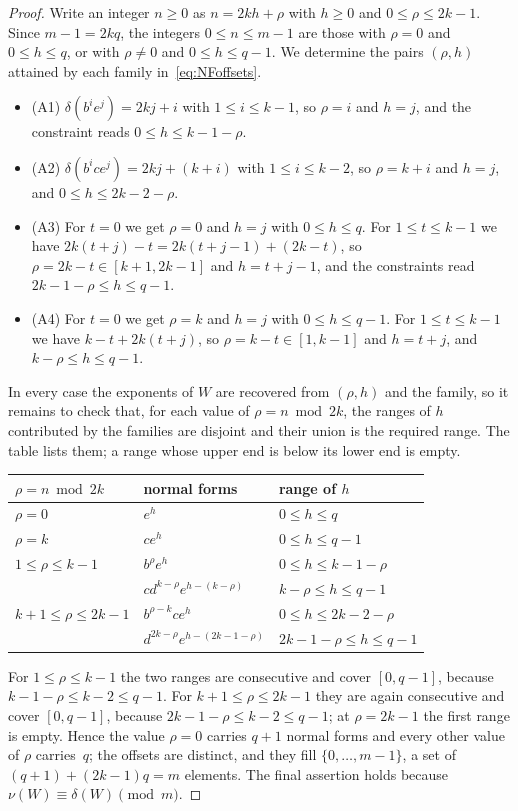 \documentclass[11pt,letterpaper]{article}
\numberwithin{equation}{section}
\theoremstyle{plain}
\theoremstyle{remark}
\begin{document}
\begin{proof}
Write an integer $n\ge 0$ as $n=2kh+\rho$ with $h\ge 0$ and $0\le\rho\le 2k-1$. Since $m-1=2kq$, the integers $0\le n\le m-1$ are those with $\rho=0$ and $0\le h\le q$, or with $\rho\ne 0$ and $0\le h\le q-1$. We determine the pairs $(\rho,h)$ attained by each family in~\eqref{eq:NFoffsets}.
\begin{itemize}
\item (A1) $\delta(b^ie^j)=2kj+i$ with $1\le i\le k-1$, so $\rho=i$ and $h=j$, and the constraint reads $0\le h\le k-1-\rho$.
\item (A2) $\delta(b^ice^j)=2kj+(k+i)$ with $1\le i\le k-2$, so $\rho=k+i$ and $h=j$, and $0\le h\le 2k-2-\rho$.
\item (A3) For $t=0$ we get $\rho=0$ and $h=j$ with $0\le h\le q$. For $1\le t\le k-1$ we have $2k(t+j)-t=2k(t+j-1)+(2k-t)$, so $\rho=2k-t\in[k+1,2k-1]$ and $h=t+j-1$, and the constraints read $2k-1-\rho\le h\le q-1$.
\item (A4) For $t=0$ we get $\rho=k$ and $h=j$ with $0\le h\le q-1$. For $1\le t\le k-1$ we have $k-t+2k(t+j)$, so $\rho=k-t\in[1,k-1]$ and $h=t+j$, and $k-\rho\le h\le q-1$.
\end{itemize}
In every case the exponents of $W$ are recovered from $(\rho,h)$ and the family, so it remains to check that, for each value of $\rho=n\bmod 2k$, the ranges of $h$ contributed by the families are disjoint and their union is the required range. The table lists them; a range whose upper end is below its lower end is empty.
\begin{center}
\renewcommand{\arraystretch}{1.25}
\begin{tabular}{lll}
$\rho=n\bmod 2k$ & normal forms & range of $h$\\
\hline
$\rho=0$ & $e^h$ & $0\le h\le q$\\
$\rho=k$ & $ce^h$ & $0\le h\le q-1$\\
$1\le\rho\le k-1$ & $b^{\rho}e^h$ & $0\le h\le k-1-\rho$\\
 & $cd^{k-\rho}e^{h-(k-\rho)}$ & $k-\rho\le h\le q-1$\\
$k+1\le\rho\le 2k-1$ & $b^{\rho-k}ce^h$ & $0\le h\le 2k-2-\rho$\\
 & $d^{2k-\rho}e^{h-(2k-1-\rho)}$ & $2k-1-\rho\le h\le q-1$
\end{tabular}
\end{center}
For $1\le\rho\le k-1$ the two ranges are consecutive and cover $[0,q-1]$, because $k-1-\rho\le k-2\le q-1$. For $k+1\le\rho\le 2k-1$ they are again consecutive and cover $[0,q-1]$, because $2k-1-\rho\le k-2\le q-1$; at $\rho=2k-1$ the first range is empty. Hence the value $\rho=0$ carries $q+1$ normal forms and every other value of $\rho$ carries~$q$; the offsets are distinct, and they fill $\{0,\dots,m-1\}$, a set of $(q+1)+(2k-1)q=m$ elements. The final assertion holds because $\nu(W)\equiv\delta(W)\pmod m$.
\end{proof}
\end{document}
